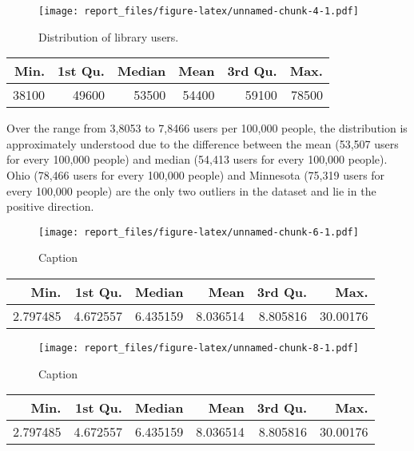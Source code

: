 \documentclass[12pt,]{article}
\begin{document}
\vspace{20pt}

\begin{figure}[htbp]
\centering
\texttt{[image: report\_files/figure-latex/unnamed-chunk-4-1.pdf]}
\caption{Distribution of library users.}
\end{figure}

\begin{longtable}[]{@{}rrrrrr@{}}
\toprule
Min. & 1st Qu. & Median & Mean & 3rd Qu. & Max.\tabularnewline
\midrule
\endhead
38100 & 49600 & 53500 & 54400 & 59100 & 78500\tabularnewline
\bottomrule
\end{longtable}

\vspace{0pt}

Over the range from 3,8053 to 7,8466 users per 100,000 people, the
distribution is approximately understood due to the difference between
the mean (53,507 users for every 100,000 people) and median (54,413
users for every 100,000 people). Ohio (78,466 users for every 100,000
people) and Minnesota (75,319 users for every 100,000 people) are the
only two outliers in the dataset and lie in the positive direction.

\newpage

\vspace{20pt}

\begin{figure}[htbp]
\centering
\texttt{[image: report\_files/figure-latex/unnamed-chunk-6-1.pdf]}
\caption{Caption}
\end{figure}

\begin{longtable}[]{@{}rrrrrr@{}}
\toprule
Min. & 1st Qu. & Median & Mean & 3rd Qu. & Max.\tabularnewline
\midrule
\endhead
2.797485 & 4.672557 & 6.435159 & 8.036514 & 8.805816 &
30.00176\tabularnewline
\bottomrule
\end{longtable}

\vspace{10pt}

\vspace{20pt}

\begin{figure}[htbp]
\centering
\texttt{[image: report\_files/figure-latex/unnamed-chunk-8-1.pdf]}
\caption{Caption}
\end{figure}

\begin{longtable}[]{@{}rrrrrr@{}}
\toprule
Min. & 1st Qu. & Median & Mean & 3rd Qu. & Max.\tabularnewline
\midrule
\endhead
2.797485 & 4.672557 & 6.435159 & 8.036514 & 8.805816 &
30.00176\tabularnewline
\bottomrule
\end{longtable}

\vspace{10pt}

\newpage




\newpage
\singlespacing 
\end{document}
